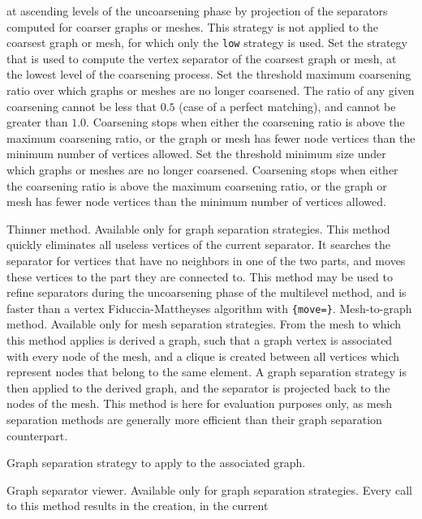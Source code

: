 \begin{itemize}
\begin{itemize}
at ascending levels of the uncoarsening phase by projection of the
separators computed for coarser graphs or meshes.  This strategy is
not applied to the coarsest graph or mesh, for which only the
{\tt low} strategy is used.
\iteme[{\tt low=}{\it strat}]
Set the strategy that is used to compute the vertex separator of the
coarsest graph or mesh, at the lowest level of the coarsening process.
\iteme[{\tt rat=}{\it rat}]
Set the threshold maximum coarsening ratio over which graphs or meshes
are no longer coarsened. The ratio of any given coarsening cannot be
less that $0.5$ (case of a perfect matching), and cannot be greater
than $1.0$. Coarsening stops when either the coarsening ratio is
above the maximum coarsening ratio, or the graph or mesh has fewer
node vertices than the minimum number of vertices allowed.
\iteme[{\tt vert=}{\it nbr}]
Set the threshold minimum size under which graphs or meshes are no longer
coarsened. Coarsening stops when either the coarsening ratio is above the
maximum coarsening ratio, or the graph or mesh has fewer node vertices
than the minimum number of vertices allowed.
\end{itemize}
\iteme[{\tt t}]
Thinner method. Available only for graph separation strategies.
This method quickly eliminates all useless vertices of
the current separator. It searches the separator for vertices that
have no neighbors in one of the two parts, and moves these vertices to
the part they are connected to. This method may be used to refine
separators during the uncoarsening phase of the multilevel method,
and is faster than a vertex Fiduccia-Mattheyses algorithm with
{\tt \{move\lbt =\}}.
\iteme[{\tt v}]
Mesh-to-graph method. Available only for mesh separation strategies.
From the mesh to which this method applies is derived a graph,
such that a graph vertex is associated with every node of the
mesh, and a clique is created between all vertices which represent
nodes that belong to the same element. A graph separation strategy is
then applied to the derived graph, and the separator is projected
back to the nodes of the mesh. This method is here for evaluation
purposes only, as mesh separation methods are generally more
efficient than their graph separation counterpart.
\begin{itemize}
\iteme[{\tt strat=}{\it strat}]
Graph separation strategy to apply to the associated graph.
\end{itemize}
\iteme[{\tt w}]
Graph separator viewer. Available only for graph separation strategies.
Every call to this method results in the creation, in the current

\end{itemize}
